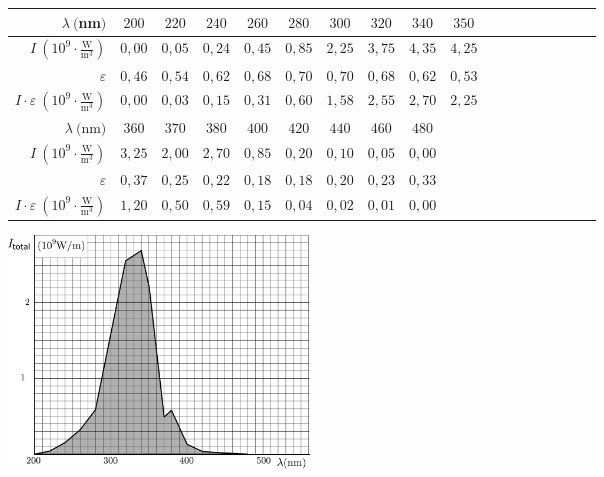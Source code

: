 {\begin{tabular}{r|c|c|c|c|c|c|c|c|c|c|c|c|c|c|c|c|c|}
	\hline
	$ \lambda \ ($nm$)                                               $&$ 200  $&$ 220  $&$ 240  $&$ 260  $&$ 280  $&$ 300  $&$ 320  $&$ 340  $&$ 350  $\\
	\hline
	$ I \ (10^9 \cdot \frac{\text{W}}{\text{m}^3})                   $&$ 0,00 $&$ 0,05 $&$ 0,24 $&$ 0,45 $&$ 0,85 $&$ 2,25 $&$ 3,75 $&$ 4,35 $&$ 4,25 $\\
	\hline
	$ \varepsilon                                                    $&$ 0,46 $&$ 0,54 $&$ 0,62 $&$ 0,68 $&$ 0,70 $&$ 0,70 $&$ 0,68 $&$ 0,62 $&$ 0,53 $\\
	\hline
	$ I \cdot \varepsilon \ (10^9 \cdot \frac{\text{W}}{\text{m}^3}) $&$ 0,00 $&$ 0,03 $&$ 0,15 $&$ 0,31 $&$ 0,60 $&$ 1,58 $&$ 2,55 $&$ 2,70 $&$ 2,25 $\\
	\hline
	\hline
	$ \lambda \ ($nm$)                                               $&$ 360  $&$ 370  $&$ 380  $&$ 400  $&$ 420  $&$ 440  $&$ 460  $&$ 480  $\\
	\hline
	$ I \ (10^9 \cdot \frac{\text{W}}{\text{m}^3})                   $&$ 3,25 $&$ 2,00 $&$ 2,70 $&$ 0,85 $&$ 0,20 $&$ 0,10 $&$ 0,05 $&$ 0,00 $\\
	\hline
	$ \varepsilon                                                    $&$ 0,37 $&$ 0,25 $&$ 0,22 $&$ 0,18 $&$ 0,18 $&$ 0,20 $&$ 0,23 $&$ 0,33 $\\
	\hline
	$ I \cdot \varepsilon \ (10^9 \cdot \frac{\text{W}}{\text{m}^3}) $&$ 1,20 $&$ 0,50 $&$ 0,59 $&$ 0,15 $&$ 0,04 $&$ 0,02 $&$ 0,01 $&$ 0,00 $\\ 	
\end{tabular}

\begin{center}
	\includegraphics[width=80mm]{2011-lahg-04-intensity-ing}
\end{center}
\fi
}